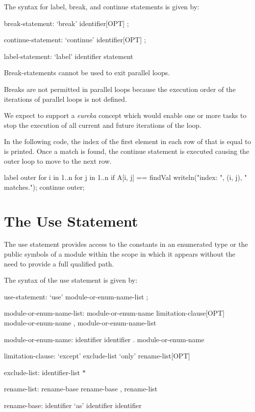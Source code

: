 The syntax for label, break, and continue statements is given by:
\begin{syntax}
break-statement:
  `break' identifier[OPT] ;

continue-statement:
  `continue' identifier[OPT] ;

label-statement:
  `label' identifier statement
\end{syntax}

Break-statements cannot be used to exit parallel loops.

\begin{rationale}
Breaks are not permitted in parallel loops because the execution order
of the iterations of parallel loops is not defined.
\end{rationale}

\begin{future}
We expect to support a \emph{eureka} concept which would enable one or
more tasks to stop the execution of all current and future iterations
of the loop.
\end{future}

\begin{example}
In the following code, the index of the first element in each row of
 that is equal to  is printed.  Once a match is
found, the continue statement is executed causing the outer loop to
move to the next row.
\begin{chapel}
label outer for i in 1..n {
  for j in 1..n {
    if A[i, j] == findVal {
      writeln("index: ", (i, j), " matches.");
      continue outer;
    }
  }
}
\end{chapel}
\end{example}

\section{The Use Statement}
\label{The_Use_Statement}

The use statement provides access to the constants in an enumerated type or
the public symbols of a module within the scope in which it appears without
the need to provide a full qualified path.

The syntax of the use statement is given by:

\begin{syntax}
use-statement:
  `use' module-or-enum-name-list ;

module-or-enum-name-list:
  module-or-enum-name limitation-clause[OPT]
  module-or-enum-name , module-or-enum-name-list

module-or-enum-name:
  identifier
  identifier . module-or-enum-name

limitation-clause:
  `except' exclude-list
  `only' rename-list[OPT]

exclude-list:
  identifier-list
  $ * $

rename-list:
  rename-base
  rename-base , rename-list

rename-base:
  identifier `as' identifier
  identifier
\end{syntax}

